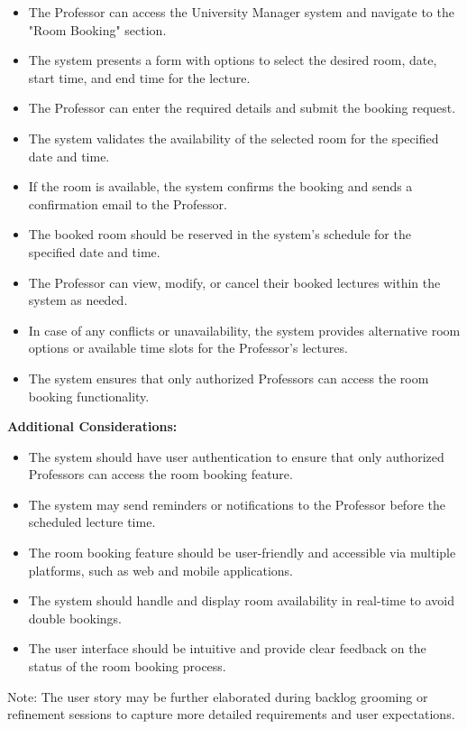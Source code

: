 \documentclass[article,onecolumn]{IEEEtran}
\begin{document}
\begin{framed}
	\begin{itemize}
		\item The Professor can access the University Manager system and navigate to the "Room Booking" section.
		\item The system presents a form with options to select the desired room, date, start time, and end time for the lecture.
		\item The Professor can enter the required details and submit the booking request.
		\item The system validates the availability of the selected room for the specified date and time.
		\item If the room is available, the system confirms the booking and sends a confirmation email to the Professor.
		\item The booked room should be reserved in the system's schedule for the specified date and time.
		\item The Professor can view, modify, or cancel their booked lectures within the system as needed.
		\item In case of any conflicts or unavailability, the system provides alternative room options or available time slots for the Professor's lectures.
		\item The system ensures that only authorized Professors can access the room booking functionality.
	\end{itemize}
	
	\textbf{Additional Considerations:}
	
	\begin{itemize}
		\item The system should have user authentication to ensure that only authorized Professors can access the room booking feature.
		\item The system may send reminders or notifications to the Professor before the scheduled lecture time.
		\item The room booking feature should be user-friendly and accessible via multiple platforms, such as web and mobile applications.
		\item The system should handle and display room availability in real-time to avoid double bookings.
		\item The user interface should be intuitive and provide clear feedback on the status of the room booking process.
	\end{itemize}
	
	Note: The user story may be further elaborated during backlog grooming or refinement sessions to capture more detailed requirements and user expectations.
\end{framed}
\end{document}
